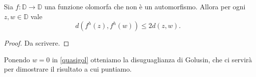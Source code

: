 \begin{cor} \label{quasigolusin}
  Sia $f:\mathbb{D} \longrightarrow \mathbb{D}$ una funzione olomorfa che non è un automorfismo. Allora per ogni $z, w \in \mathbb{D}$ vale
  \begin{equation} \label{quasigol}
    d(f^h(z), f^h(w)) \le 2d(z,w).
  \end{equation}
\end{cor}


\begin{proof}
  Da scrivere.
\end{proof}

Ponendo $w=0$ in \eqref{quasigol} otteniamo la disuguaglianza di Golusin, che ci servirà per dimostrare il risultato a cui puntiamo.
